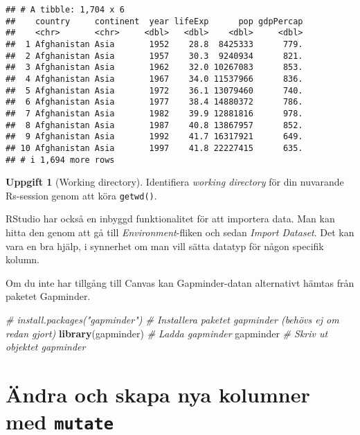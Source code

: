 \documentclass[
]{book}
\newenvironment{Shaded}{\begin{snugshade}}{\end{snugshade}}
\newcommand{\CommentTok}[1]{\textcolor[rgb]{0.56,0.35,0.01}{\textit{#1}}}
\newcommand{\FunctionTok}[1]{\textcolor[rgb]{0.13,0.29,0.53}{\textbf{#1}}}
\newcommand{\NormalTok}[1]{#1}
\theoremstyle{definition}
\theoremstyle{definition}
\theoremstyle{definition}
\newtheorem{exercise}{Uppgift}[chapter]
\theoremstyle{definition}
\theoremstyle{remark}
\begin{document}
\begin{verbatim}
## # A tibble: 1,704 x 6
##    country     continent  year lifeExp      pop gdpPercap
##    <chr>       <chr>     <dbl>   <dbl>    <dbl>     <dbl>
##  1 Afghanistan Asia       1952    28.8  8425333      779.
##  2 Afghanistan Asia       1957    30.3  9240934      821.
##  3 Afghanistan Asia       1962    32.0 10267083      853.
##  4 Afghanistan Asia       1967    34.0 11537966      836.
##  5 Afghanistan Asia       1972    36.1 13079460      740.
##  6 Afghanistan Asia       1977    38.4 14880372      786.
##  7 Afghanistan Asia       1982    39.9 12881816      978.
##  8 Afghanistan Asia       1987    40.8 13867957      852.
##  9 Afghanistan Asia       1992    41.7 16317921      649.
## 10 Afghanistan Asia       1997    41.8 22227415      635.
## # i 1,694 more rows
\end{verbatim}

\begin{exercise}[Working directory]
Identifiera \emph{working directory} för din nuvarande Rs-session genom att köra \texttt{getwd()}.
\end{exercise}

RStudio har också en inbyggd funktionalitet för att importera data. Man kan hitta den genom att gå till \emph{Environment}-fliken och sedan \emph{Import Dataset}. Det kan vara en bra hjälp, i synnerhet om man vill sätta datatyp för någon specifik kolumn.

Om du inte har tillgång till Canvas kan Gapminder-datan alternativt hämtas från paketet Gapminder.

\begin{Shaded}
\begin{Highlighting}[]
\CommentTok{\# install.packages("gapminder")        \# Installera paketet gapminder (behövs ej om redan gjort)}
\FunctionTok{library}\NormalTok{(gapminder)                     }\CommentTok{\# Ladda gapminder}
\NormalTok{gapminder                              }\CommentTok{\# Skriv ut objektet gapminder}
\end{Highlighting}
\end{Shaded}

\hypertarget{uxe4ndra-och-skapa-nya-kolumner-med-mutate}{%
\section{\texorpdfstring{Ändra och skapa nya kolumner med \texttt{mutate}}{Ändra och skapa nya kolumner med mutate}}\label{uxe4ndra-och-skapa-nya-kolumner-med-mutate}}
\end{document}
